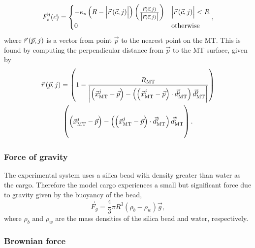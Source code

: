 \begin{equation} \label{eq:steric_force}
\vec{F}_s^j(\vec{c})= 
\begin{cases}

	- \kappa_s \left(R - \vqty\Big{ \rvec{\vec{c}} } \right) \left( \frac{\rvec{\vec{c}}}{\vqty\big{ \rvec{\vec{c}} }} \right) & \vqty\Big{ \rvec{\vec{c}} } <  R\\
	
	0 & \text{otherwise}
	
\end{cases},
\end{equation}
where $\vec{r} \left(\vec{p} , j \right)$ is a vector from point $\vec{p}$ to the nearest point on the MT. This is found by computing the perpendicular distance from $\vec{p}$ to the MT surface, given by
\def\ceq{\left( \xmt^j-\vec{p} \right) - \left( \left( \xmt^j - \vec{p} \right) \cdot \dmt^j \right) \dmt^j}
\def\rbyceq{\frac{R_\text{MT}}{\vqty\bigg{\ceq}}}
%
\begin{multline} \label{eq:r_vec}
\rvec{\vec{p}} = 
\left( 1- \rbyceq \right)  \\
\left( \ceq \vphantom{\rbyceq} \right).
\end{multline}

\subsubsection*{Force of gravity}

The experimental system uses a silica bead with density greater than water as the cargo. Therefore the model cargo experiences a small but significant force due to gravity given by the buoyancy of the bead,
\begin{equation} \label{eq:F_g}
\vec{F}_g= \frac{4}{3} \pi R^3 (\rho_b - \rho_w) \vec{g},
\end{equation}
where $\rho_b$ and $\rho_w$ are the mass densities of the silica bead and water, respectively.

\subsubsection*{Brownian force}

